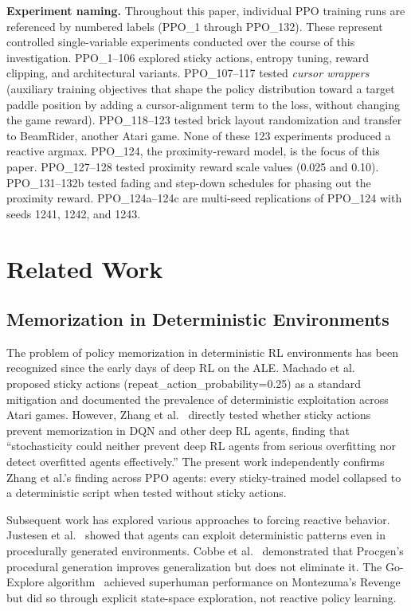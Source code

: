 \documentclass[11pt]{article}
\begin{document}
\noindent \textbf{Experiment naming.} Throughout this paper, individual PPO
training runs are referenced by numbered labels (PPO\_1 through PPO\_132).
These represent controlled single-variable experiments conducted over the
course of this investigation. PPO\_1--106 explored sticky actions, entropy
tuning, reward clipping, and architectural variants. PPO\_107--117 tested
\textit{cursor wrappers} (auxiliary training objectives that shape the policy
distribution toward a target paddle position by adding a cursor-alignment term
to the loss, without changing the game reward). PPO\_118--123 tested brick
layout randomization and transfer to BeamRider, another Atari game. None of
these 123 experiments produced a reactive argmax. PPO\_124, the proximity-reward
model, is the focus of this paper. PPO\_127--128 tested proximity reward scale
values (0.025 and 0.10). PPO\_131--132b tested fading and step-down schedules
for phasing out the proximity reward. PPO\_124a--124c are multi-seed
replications of PPO\_124 with seeds 1241, 1242, and 1243.

\section{Related Work}

\subsection{Memorization in Deterministic Environments}

The problem of policy memorization in deterministic RL environments has been
recognized since the early days of deep RL on the ALE. Machado et
al.~\cite{machado2018revisiting} proposed sticky actions
(repeat\_action\_probability=0.25) as a standard mitigation and documented the
prevalence of deterministic exploitation across Atari games. However, Zhang et
al.~\cite{zhang2018overfitting} directly tested whether sticky actions prevent
memorization in DQN and other deep RL agents, finding that ``stochasticity could
neither prevent deep RL agents from serious overfitting nor detect overfitted
agents effectively.'' The present work independently confirms Zhang et al.'s
finding across PPO agents: every sticky-trained model collapsed to a
deterministic script when tested without sticky actions.

Subsequent work has explored various approaches to forcing reactive behavior.
Justesen et al.~\cite{justesen2018illuminating} showed that agents can exploit
deterministic patterns even in procedurally generated environments. Cobbe et
al.~\cite{cobbe2020procgen} demonstrated that Procgen's procedural generation
improves generalization but does not eliminate it. The Go-Explore
algorithm~\cite{ecoffet2021goexplore} achieved superhuman performance on Montezuma's
Revenge but did so through explicit state-space exploration, not reactive
policy learning.
\end{document}
